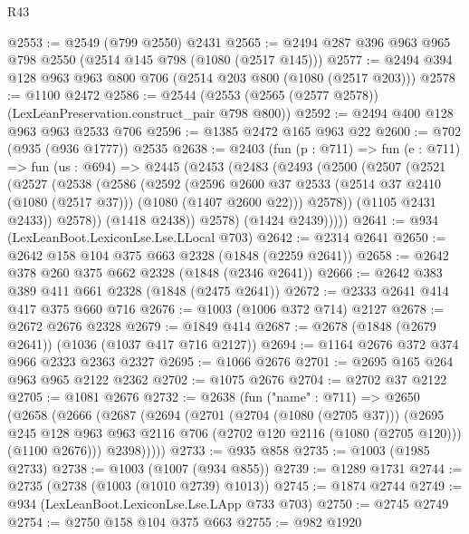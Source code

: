 \begin{lexlean}{R43}
\begin{coremodule}
@2553 := @2549 (@799 @2550) @2431
@2565 := @2494 @287 @396 @963 @965 @798 @2550 (@2514 @145 @798 (@1080 (@2517 @145)))
@2577 := @2494 @394 @128 @963 @963 @800 @706 (@2514 @203 @800 (@1080 (@2517 @203)))
@2578 := @1100 @2472
@2586 := @2544 (@2553 (@2565 (@2577 @2578)) (LexLeanPreservation.construct_pair @798 @800))
@2592 := @2494 @400 @128 @963 @963 @2533 @706
@2596 := @1385 @2472 @165 @963 @22
@2600 := @702 (@935 (@936 @1777)) @2535
@2638 := @2403
    (fun (p : @711) =>
    fun (e : @711) =>
    fun (us : @694) =>
    @2445
      (@2453
        (@2483
          (@2493
            (@2500
              (@2507
                (@2521
                  (@2527
                    (@2538
                      (@2586
                        (@2592
                          (@2596
                            @2600
                            @37
                            @2533
                            (@2514 @37 @2410 (@1080 (@2517 @37)))
                            (@1080 (@1407 @2600 @22)))
                          @2578))
                      (@1105 @2431 @2433))
                    @2578))
                (@1418 @2438))
              @2578)
            (@1424 @2439)))))
@2641 := @934 (LexLeanBoot.LexiconLse.Lse.LLocal @703)
@2642 := @2314 @2641
@2650 := @2642 @158 @104 @375 @663 @2328 (@1848 (@2259 @2641))
@2658 := @2642 @378 @260 @375 @662 @2328 (@1848 (@2346 @2641))
@2666 := @2642 @383 @389 @411 @661 @2328 (@1848 (@2475 @2641))
@2672 := @2333 @2641 @414 @417 @375 @660 @716
@2676 := @1003 (@1006 @372 @714) @2127
@2678 := @2672 @2676 @2328
@2679 := @1849 @414
@2687 := @2678 (@1848 (@2679 @2641)) (@1036 (@1037 @417 @716 @2127))
@2694 := @1164 @2676 @372 @374 @966 @2323 @2363 @2327
@2695 := @1066 @2676
@2701 := @2695 @165 @264 @963 @965 @2122 @2362
@2702 := @1075 @2676
@2704 := @2702 @37 @2122
@2705 := @1081 @2676
@2732 := @2638
    (fun ("name" : @711) =>
    @2650
      (@2658
        (@2666
          (@2687
            (@2694
              (@2701
                (@2704 (@1080 (@2705 @37)))
                (@2695
                  @245
                  @128
                  @963
                  @963
                  @2116
                  @706
                  (@2702 @120 @2116 (@1080 (@2705 @120)))
                  (@1100 @2676)))
              @2398)))))
@2733 := @935 @858
@2735 := @1003 (@1985 @2733)
@2738 := @1003 (@1007 (@934 @855))
@2739 := @1289 @1731
@2744 := @2735 (@2738 (@1003 (@1010 @2739) @1013))
@2745 := @1874 @2744
@2749 := @934 (LexLeanBoot.LexiconLse.Lse.LApp @733 @703)
@2750 := @2745 @2749
@2754 := @2750 @158 @104 @375 @663
@2755 := @982 @1920

\end{coremodule}
\end{lexlean}
